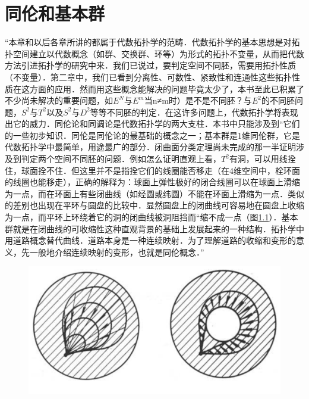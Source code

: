 \chapter{同伦和基本群}
“本章和以后各章所讲的都属于代数拓扑学的范畴．代数拓扑学的基本思想是对拓扑空间建立以代数概念（如群、交换群、环等）为形式的拓扑不变量，从而把代数方法引进拓扑学的研究中来．我们已说过，要判定空间不同胚，需要用拓扑性质（不变量）．第二章中，我们已看到分离性、可数性、紧致性和连通性这些拓扑性质在这方面的应用．然而用这些概念能解决的问题毕竟太少了，本书至此已积累了不少尚未解决的重要问题，如\(E^N\)与\(E^m\)当n≠m时）是不是不同胚？与\(E^2\)的不同胚问题，\(S^2\)与\(T^2\)以及\(S^2\)与\(D^2\)等等不同胚的判定．在这许多问题上，代数拓扑学将表现出它的威力．同伦论和同调论是代数拓扑学的两大支柱．本书中只能涉及到“它们的一些初步知识．同伦是同伦论的最基础的概念之一；基本群是1维同伦群，它是代数拓扑学中最简单，用途最广的部分．闭曲面分类定理尚未完成的那一半证明涉及到判定两个空间不同胚的问题．例如怎么证明直观上看，\(T^2\)有洞，可以用线拴住，球面拴不住．但这里并不是指拴它们的线圈能否移走（在4维空间中，栓环面的线圈也能移走），正确的解释为：球面上弹性极好的闭合线圈可以在球面上滑缩为一点，而在环面上有些闭曲线（如经圆或纬圆）不能在环面上滑缩为一点．类似的差别也出现在平环与圆盘的比较中．显然圆盘上的闭曲线可容易地在圆盘上收缩为一点，而平环上环绕着它的洞的闭曲线被洞阻挡而“缩不成一点（图\ref{fig:enter-label_18}）．基本群就是在闭曲线的可收缩性这种直观背景的基础上发展起来的一种结构．拓扑学中用道路概念替代曲线．道路本身是一种连续映射．为了理解道路的收缩和变形的意义，先一般地介绍连续映射的变形，也就是同伦概念．”
\begin{figure}[H]
    \centering
    \includegraphics[width=0.5\linewidth]{image_18.png}
    \caption{}
    \label{fig:enter-label_18}
\end{figure}
